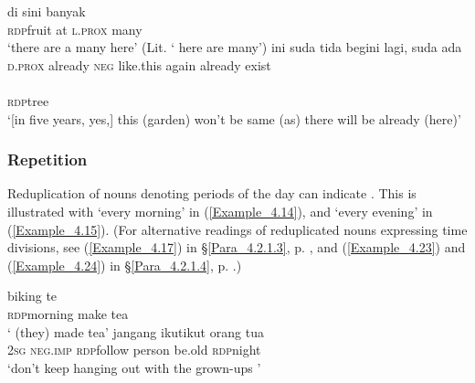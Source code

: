 \ea
\label{Example_4.12}
 {di} {sini} {banyak}\\ %
 \textsc{rdp}{\Tilde}fruit  at  \textsc{l.prox}  many\\

\glt 
‘there are a many  here’ (Lit. ‘ here are many’) \textstyleExampleSource{[080922-001a-CvPh.0425]}
\z
\ea
\label{Example_4.13}
\gll {\ldots} {ini} {suda} {tida} {begini} {lagi}, {suda} {ada}\\ %
  { } \textsc{d.prox}  already  \textsc{neg}  like.this  again  already  exist\\
 \\
 {\textsc{rdp}{\Tilde}tree}\\

\glt
‘[in five years, yes,] this (garden) won’t be same (as) there will be already  (here)’ \textstyleExampleSource{[081029-001-Cv.0007]}

\z

\subsubsection[Repetition]{Repetition}
\label{Para_4.2.1.2}
Reduplication of nouns denoting periods of the day can indicate . This is illustrated with  ‘every morning’ in (\ref{Example_4.14}), and  ‘every evening’ in (\ref{Example_4.15}). (For alternative readings of reduplicated nouns expressing time divisions, see (\ref{Example_4.17}) in §\ref{Para_4.2.1.3}, p. \pageref{Example_4.17}, and (\ref{Example_4.23}) and (\ref{Example_4.24}) in §\ref{Para_4.2.1.4}, p. \pageref{Example_4.23}.)


\ea
\label{Example_4.14}
 {biking} {te}\\ %
 \textsc{rdp}{\Tilde}morning  make  tea\\
\glt 
‘ (they) made tea’ \textstyleExampleSource{[081025-009a-Cv.0023]}
\z
\ea
\label{Example_4.15}
 {jangang} {ikut{\Tilde}ikut} {orang} {tua} {}\\ %
 \textsc{2sg}  \textsc{neg.imp}  \textsc{rdp}{\Tilde}follow  person  be.old  \textsc{rdp}{\Tilde}night\\
\glt
‘don’t keep hanging out with the grown-ups ’ \textstyleExampleSource{[081013-002-Cv.0005]}

